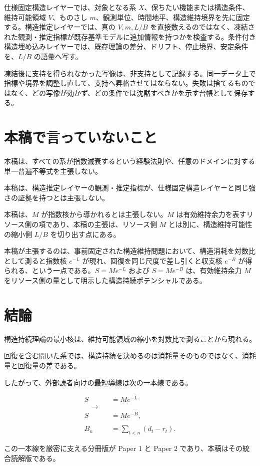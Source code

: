 \documentclass[12pt,a4paper]{article}
\begin{document}
仕様固定構造レイヤーでは、対象となる系 \(X\)、保ちたい機能または構造条件、維持可能領域 \(V\)、ものさし \(m\)、観測単位、時間地平、構造維持境界を先に固定する。構造推定レイヤーでは、真の \(V,m,L/B\) を直接数えるのではなく、凍結された観測・推定指標が既存基準モデルに追加情報を持つかを検査する。条件付き構造埋め込みレイヤーでは、既存理論の差分、ドリフト、停止境界、安定条件を、\(L/B\) の語彙へ写す。

凍結後に支持を得られなかった写像は、非支持として記録する。同一データ上で指標や境界を調整し直して、支持へ昇格させてはならない。失敗は捨てるものではなく、どの写像が効かず、どの条件では沈黙すべきかを示す台帳として保存する。

\section{本稿で言っていないこと}\label{ux672cux7a3fux3067ux8a00ux3063ux3066ux3044ux306aux3044ux3053ux3068}

本稿は、すべての系が指数減衰するという経験法則や、任意のドメインに対する単一普遍不等式を主張しない。

本稿は、構造推定レイヤーの観測・推定指標が、仕様固定構造レイヤーと同じ強さの証拠を持つとは主張しない。

本稿は、\(M\) が指数核から導かれるとは主張しない。\(M\) は有効維持余力を表すリソース側の項であり、本稿の主張は、リソース側 \(M\) とは別に、構造維持可能性の縮小側 \(L/B\) を切り出す点にある。

本稿が主張するのは、事前固定された構造維持問題において、構造消耗を対数比として測ると指数核 \(e^{-L}\) が現れ、回復を同じ尺度で差し引くと収支核 \(e^{-B}\) が得られる、という一点である。\(S=Me^{-L}\) および \(S=Me^{-B}\) は、有効維持余力 \(M\) をリソース側の量として明示した構造持続ポテンシャルである。

\section{結論}\label{ux7d50ux8ad6}

構造持続理論の最小核は、維持可能領域の縮小を対数比で測ることから現れる。

回復を含む開いた系では、構造持続を決めるのは消耗量そのものではなく、消耗量と回復量の差である。

したがって、外部読者向けの最短導線は次の一本線である。

\[
\begin{aligned}
S&=Me^{-L} \\
\quad\longrightarrow\quad \\
S&=Me^{-B}, \\
\qquad \\
B_{n}&=\sum_{t<n}(d_{t}-r_{t}).
\end{aligned}
\]

この一本線を厳密に支える分冊版が Paper 1 と Paper 2 であり、本稿はその統合読解版である。
\end{document}

